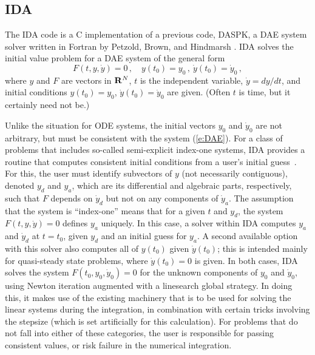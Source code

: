 \subsection{IDA}\label{ss:IDA}

The IDA code is a C implementation of a previous code, DASPK, a DAE
system solver written in Fortran by Petzold, Brown, and Hindmarsh
\cite{BHP:94,BCP:96}.  IDA solves the initial value problem for 
a DAE system of the general form
\begin{equation}\label{e:DAE}
  F(t,y,{\dot y}) = 0 \, ,
  \quad y(t_0) = y_0 \, ,~ {\dot y}(t_0) = {\dot y}_0 \, ,
\end{equation}
where $y$ and $F$ are vectors in ${\bf R}^N$, $t$ is the independent
variable, ${\dot y} = dy/dt$, 
and initial conditions $y(t_0) = y_0$, ${\dot y}(t_0) = {\dot y}_0$ 
are given.  (Often $t$ is time, but it certainly need not be.)

Unlike the situation for ODE systems, the initial vectors $y_0$ and
${\dot y}_0$ are not arbitrary, but must be consistent with the system
(\ref{e:DAE}).  For a class of problems that includes so-called
semi-explicit index-one systems, IDA provides a routine that computes
consistent initial conditions from a user's initial guess~\cite{BHP:98}.  
For this, the user must identify subvectors of $y$
(not necessarily contiguous), denoted $y_d$ and $y_a$, which are its
differential and algebraic parts, respectively, such that $F$ depends
on ${\dot y}_d$ but not on any components of ${\dot y}_a$.  The assumption that
the system is ``index-one'' means that for a given $t$ and $y_d$, the
system $F(t,y,{\dot y}) = 0$ defines $y_a$ uniquely.  In this case, a solver
within IDA computes $y_a$ and ${\dot y}_d$ at $t = t_0$, given $y_d$ and an
initial guess for $y_a$.  A second available option with this solver
also computes all of $y(t_0)$ given ${\dot y}(t_0)$; this is intended mainly
for quasi-steady state problems, where ${\dot y}(t_0) = 0$ is given.
In both cases, IDA solves the system $F(t_0,y_0, {\dot y}_0) = 0$ for the
unknown components of $y_0$ and ${\dot y}_0$, using Newton iteration
augmented with a linesearch global strategy.  In doing this, it makes
use of the existing machinery that is to be used for solving the
linear systems during the integration, in combination with certain
tricks involving the stepsize (which is set artificially for this
calculation).
For problems that do not fall into either of these categories, the
user is responsible for passing consistent values, or risk failure in
the numerical integration.

